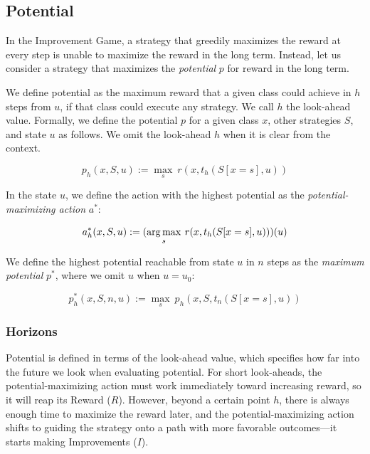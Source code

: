 \subsection{Potential}
\label{sec:potential}

In the Improvement Game, a strategy that greedily maximizes the reward at every
step is unable to maximize the reward in the long term. Instead, let us consider
a strategy that maximizes the \emph{potential} $p$ for reward in the long term.

We define potential as the maximum reward that a given class could achieve in
$h$ steps from $u$, if that class could execute any strategy. We call $h$ the look-ahead value. Formally, we
define the potential $p$ for a given class $x$, other strategies $S$, and state
$u$ as follows. We omit the look-ahead $h$ when it is clear from the context.

\begin{equation}
  p_h(x,S,u) := \max_{s} \: r(x, t_h(S[x=s], u))
\end{equation}

In the state $u$, we define the action with the highest potential as the
\emph{potential-maximizing action} $a^*$:

\begin{equation}
  a^*_h(x,S,u) := (\operatorname*{arg\,max}_{s} \: r(x, t_h(S[x=s], u)))(u)
\end{equation}

We define the highest potential reachable from state $u$ in $n$ steps as the
\emph{maximum potential} $p^*$, where we omit $u$ when $u = u_0$:

\begin{equation}
  p^*_h(x,S,n,u) := \max_{s} \: p_h(x, S, t_n(S[x=s], u))
\end{equation}

\subsubsection{Horizons}
\label{sec:horizon}

Potential is defined in terms of the look-ahead value, which specifies how far
into the future we look when evaluating potential. For short look-aheads, the
potential-maximizing action must work immediately toward increasing reward, so
it will reap its Reward ($R$). However, beyond a certain point $h$, there is
always enough time to maximize the reward later, and the
potential-maximizing action shifts to guiding the strategy onto a path with
more favorable outcomes---it starts making Improvements ($I$).


